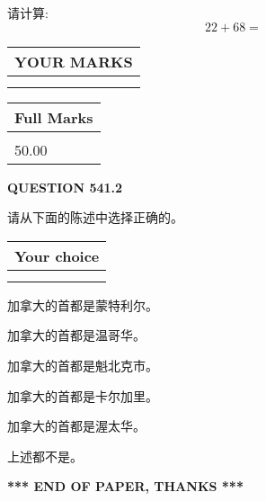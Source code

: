 \documentclass{ctexart}
\begin{document}
  
 
请计算:
\begin{equation}
22 +  %
68 = \nonumber
\end{equation}
 

 

 
  
\vspace{0.2in}
  
\noindent\begin{tabular}{|l|}
\hline
 YOUR MARKS  \\
\hline
 \\ 
 \\ 
\hline
\end{tabular}
\hspace{0.05in} \begin{tabular}{|l|}
\hline
 Full Marks  \\
\hline
 \\ 
50.00 \\
\hline
\end{tabular}
{\textbf{\Large{QUESTION
541.2 
}}}
  
  
请从下面的陈述中选择正确的。
  
  
\noindent\hspace{3.0in} \begin{tabular}{|l|}
\hline
Your choice \\
\hline
 \\ 
 \\ 
\hline
\end{tabular}
  
  
 
 
加拿大的首都是蒙特利尔。
 
 
加拿大的首都是温哥华。
 
 
加拿大的首都是魁北克市。
 
 
加拿大的首都是卡尔加里。
 
 
加拿大的首都是渥太华。
 
 
 上述都不是。
 
 
   
   
 \vspace{0.2in}
 
   
   
   
   
\vspace{1.0in} 
{\textbf{\large{ *** END OF PAPER, THANKS *** }}} 
   
\end{document}
